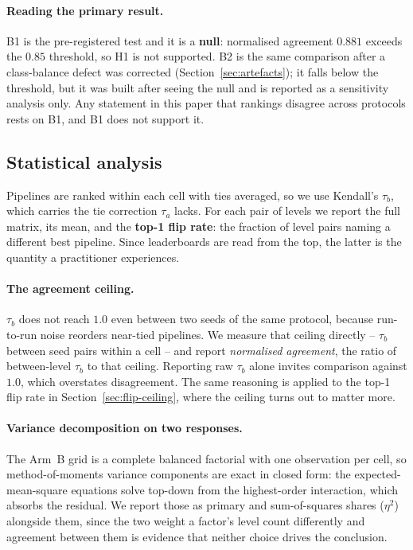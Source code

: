\documentclass[11pt,a4paper]{article}
\newcommand{\taub}{Kendall's $\tau_b$}
\begin{document}
\paragraph{Reading the primary result.} B1 is the pre-registered test and it is a
\textbf{null}: normalised agreement $0.881$ exceeds the $0.85$ threshold, so H1 is not
supported. B2 is the same comparison after a class-balance defect was corrected
(Section~\ref{sec:artefacts}); it falls below the threshold, but it was built after seeing
the null and is reported as a sensitivity analysis only. Any statement in this paper that
rankings disagree across protocols rests on B1, and B1 does not support it.

\subsection{Statistical analysis}

Pipelines are ranked within each cell with ties averaged, so we use \taub, which carries
the tie correction $\tau_a$ lacks. For each pair of levels we report the full matrix, its
mean, and the \textbf{top-1 flip rate}: the fraction of level pairs naming a different best
pipeline. Since leaderboards are read from the top, the latter is the quantity a
practitioner experiences.

\paragraph{The agreement ceiling.} $\tau_b$ does not reach $1.0$ even between two seeds of
the same protocol, because run-to-run noise reorders near-tied pipelines. We measure that
ceiling directly -- $\tau_b$ between seed pairs within a cell -- and report
\emph{normalised agreement}, the ratio of between-level $\tau_b$ to that ceiling. Reporting
raw $\tau_b$ alone invites comparison against $1.0$, which overstates disagreement. The
same reasoning is applied to the top-1 flip rate in Section~\ref{sec:flip-ceiling}, where
the ceiling turns out to matter more.

\paragraph{Variance decomposition on two responses.} The Arm~B grid is a complete balanced
factorial with one observation per cell, so method-of-moments variance components are exact
in closed form: the expected-mean-square equations solve top-down from the highest-order
interaction, which absorbs the residual. We report those as primary and sum-of-squares
shares ($\eta^2$) alongside them, since the two weight a factor's level count differently
and agreement between them is evidence that neither choice drives the conclusion.
\end{document}
